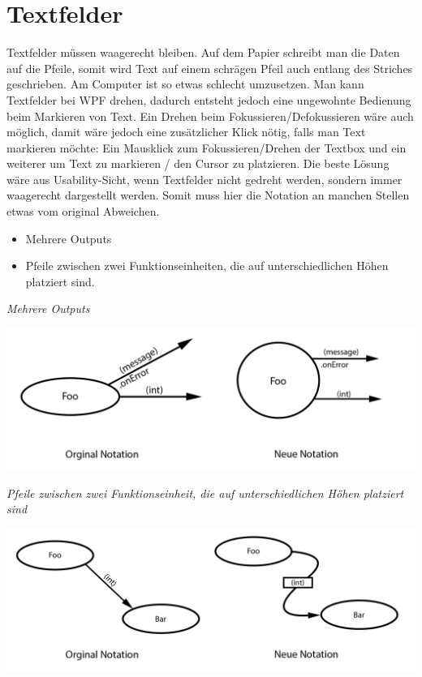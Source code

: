 \section{Textfelder}

Textfelder müssen waagerecht bleiben. Auf dem Papier schreibt man die Daten auf
die Pfeile, somit wird Text auf einem schrägen Pfeil auch entlang des Striches
geschrieben.
Am Computer ist so etwas schlecht umzusetzen. Man kann Textfelder bei WPF drehen, dadurch
entsteht jedoch eine ungewohnte Bedienung beim Markieren von Text. Ein Drehen
beim Fokussieren/Defokussieren wäre auch möglich, damit wäre jedoch eine zusätzlicher
Klick nötig, falls man Text markieren möchte: Ein Mausklick zum Fokussieren/Drehen
der Textbox und ein weiterer um Text zu markieren / den Cursor zu platzieren.
Die beste Lösung wäre aus Usability-Sicht, wenn Textfelder nicht gedreht werden,
sondern immer waagerecht dargestellt werden. Somit muss hier die Notation an
manchen Stellen etwas vom original Abweichen.
\begin{itemize}
\item Mehrere Outputs
\item Pfeile zwischen zwei Funktionseinheiten, die auf unterschiedlichen Höhen platziert
sind.
\end{itemize}

\emph{Mehrere Outputs}



\includegraphics[width=.9\linewidth]{./img/NotationChanges1.jpg}
\bigskip

\emph{
Pfeile zwischen zwei Funktionseinheit, die auf unterschiedlichen Höhen platziert
sind}

\includegraphics[width=.9\linewidth]{./img/NotationChanges2.jpg}



